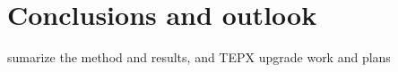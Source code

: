 \section{Conclusions and outlook} 
\label{sec:conclusion}
sumarize the method and results, and TEPX upgrade work and plans
